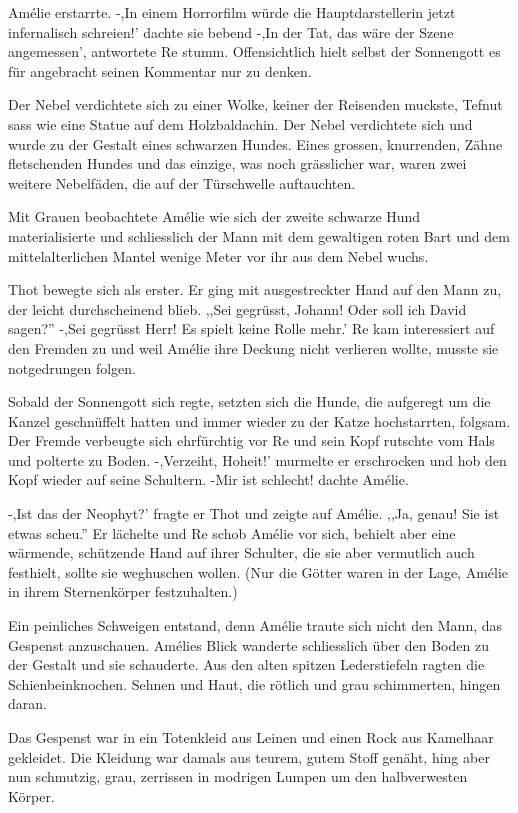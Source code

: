 \documentclass[11pt,titlepage,a5paper]{book}
\begin{document}
Amélie erstarrte. -,In  einem Horrorfilm würde die Hauptdarstellerin jetzt infernalisch schreien!' dachte sie bebend -,In der Tat, das wäre der Szene angemessen', antwortete Re stumm. Offensichtlich hielt selbst der Sonnengott es für angebracht seinen Kommentar nur zu denken.

Der Nebel verdichtete sich zu einer Wolke, keiner der Reisenden muckste, Tefnut sass wie eine Statue auf dem Holzbaldachin. Der Nebel verdichtete sich und wurde zu der Gestalt eines schwarzen Hundes. Eines grossen, knurrenden, Zähne fletschenden Hundes und das einzige, was noch grässlicher war, waren zwei weitere Nebelfäden, die auf der Türschwelle auftauchten.

Mit Grauen beobachtete Amélie wie sich der zweite schwarze Hund materialisierte und schliesslich der Mann mit dem gewaltigen roten Bart und dem mittelalterlichen Mantel wenige Meter vor ihr aus dem Nebel wuchs.

Thot bewegte sich als erster. Er ging mit ausgestreckter Hand auf den Mann zu, der leicht durchscheinend blieb. ,,Sei gegrüsst, Johann! Oder soll ich David sagen?'' -,Sei gegrüsst Herr! Es spielt keine Rolle mehr.' Re kam interessiert auf den Fremden zu und weil Amélie ihre Deckung nicht verlieren wollte, musste sie notgedrungen  folgen.

Sobald der Sonnengott sich regte, setzten sich die Hunde, die aufgeregt um die Kanzel geschnüffelt hatten und immer wieder zu der Katze hochstarrten, folgsam. Der Fremde verbeugte sich ehrfürchtig vor Re und sein Kopf rutschte vom Hals und polterte zu Boden. -,Verzeiht, Hoheit!' murmelte er erschrocken und hob den Kopf wieder auf seine Schultern. -Mir ist schlecht! dachte Amélie.

-,Ist das der Neophyt?' fragte er Thot und zeigte auf Amélie. ,,Ja, genau! Sie ist etwas scheu.'' Er lächelte und Re schob Amélie vor sich, behielt aber eine wärmende, schützende Hand auf ihrer Schulter, die sie aber vermutlich auch festhielt, sollte sie weghuschen wollen. (Nur die Götter waren in der Lage, Amélie in ihrem Sternenkörper festzuhalten.)

Ein peinliches Schweigen entstand, denn Amélie traute sich nicht den Mann, das Gespenst anzuschauen. Amélies Blick wanderte schliesslich über den Boden zu der Gestalt und sie schauderte. Aus den alten spitzen Lederstiefeln ragten die Schienbeinknochen. Sehnen und Haut, die rötlich und grau schimmerten, hingen daran. 

Das Gespenst war in ein Totenkleid aus Leinen und einen Rock aus Kamelhaar gekleidet. Die Kleidung war damals aus teurem, gutem Stoff genäht, hing aber nun schmutzig, grau, zerrissen in modrigen Lumpen um den halbverwesten Körper.
\end{document}
